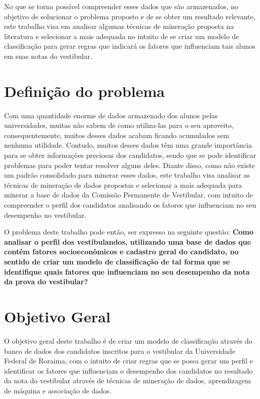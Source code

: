 No que se torna possível compreender esses dados que são armazenados, no objetivo de solucionar o problema proposto e de se obter um resultado relevante, este trabalho visa em analisar algumas técnicas de mineração proposta na literatura e selecionar a mais adequada no intuito de se criar um modelo de classificação para gerar regras que indicará os fatores que influenciam tais alunos em suas notas do vestibular.


\section{Definição do problema}

\par
Com uma quantidade enorme de dados armazenado dos alunos pelas universidades, muitas não sabem de como utiliza-las para o seu aproveito, consequentemente, muitos desses dados acabam ficando acumulados sem nenhuma utilidade. Contudo, muitos desses dados têm uma grande importância para se obter informações preciosas dos candidatos, sendo que se pode identificar problemas para poder tentar resolver alguns deles. Diante disso, como não existe um padrão consolidado para minerar esses dados, este trabalho visa analisar as técnicas de mineração de dados propostas e selecionar a mais adequada para minerar a base de dados da Comissão Permanente de Vestibular, com intuito de compreender o perfil dos candidatos analisando os fatores que influenciam no seu desempenho no vestibular.

\par
O problema deste trabalho pode então, ser expresso na seguinte questão: \textbf{Como analisar o perfil dos vestibulandos, utilizando uma base de dados que contém fatores socioeconômicos e cadastro geral do candidato, no sentido de criar um modelo de classificação de tal forma que se identifique quais fatores que influenciam no seu desempenho da nota  da prova do vestibular? }



\section{Objetivo Geral}

O objetivo geral deste trabalho é de criar um modelo de classificação através do banco de dados dos candidatos inscritos para o vestibular da Universidade Federal de Roraima, com o intuito de criar regras que se possa gerar um perfil e identificar os fatores que influenciam o desempenho dos candidatos no resultado da nota do vestibular através de técnicas de mineração de dados, aprendizagem de máquina e associação de dados.


